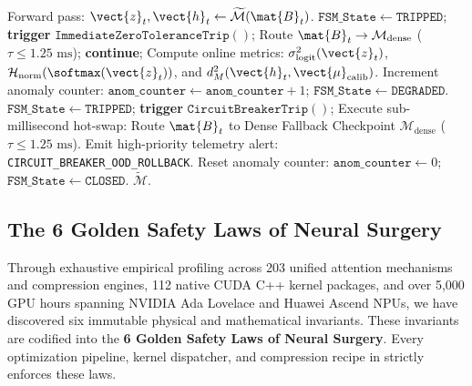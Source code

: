 \begin{algorithm}[t]
\begin{algorithmic}[1]
    \STATE Forward pass: $\vect{z}_t, \vect{h}_t \leftarrow \widetilde{\mathcal{M}}(\mat{B}_t)$.
        \STATE $\mathtt{FSM\_State} \leftarrow \mathtt{TRIPPED}$; \textbf{trigger} $\mathtt{ImmediateZeroToleranceTrip}()$;
        \STATE Route $\mat{B}_t \to \mathcal{M}_{\text{dense}}$ ($\tau \le 1.25\text{ ms}$); \textbf{continue};
    \ENDIF
    \STATE Compute online metrics: $\sigma_{\text{logit}}^2(\vect{z}_t)$, $\mathcal{H}_{\text{norm}}(\softmax(\vect{z}_t))$, and $d_M^2(\vect{h}_t, \vect{\mu}_{\text{calib}})$.
        \STATE Increment anomaly counter: $\mathtt{anom\_counter} \leftarrow \mathtt{anom\_counter} + 1$; $\mathtt{FSM\_State} \leftarrow \mathtt{DEGRADED}$.
            \STATE $\mathtt{FSM\_State} \leftarrow \mathtt{TRIPPED}$; \textbf{trigger} $\mathtt{CircuitBreakerTrip}()$;
            \STATE Execute sub-millisecond hot-swap: Route $\mat{B}_t$ to Dense Fallback Checkpoint $\mathcal{M}_{\text{dense}}$ ($\tau \le 1.25\text{ ms}$).
            \STATE Emit high-priority telemetry alert: \texttt{CIRCUIT\_BREAKER\_OOD\_ROLLBACK}.
        \ENDIF
    \ELSE
        \STATE Reset anomaly counter: $\mathtt{anom\_counter} \leftarrow 0$; $\mathtt{FSM\_State} \leftarrow \mathtt{CLOSED}$.
    \ENDIF
\ENDFOR
\RETURN $\widetilde{\mathcal{M}}$.
\end{algorithmic}
\end{algorithm}

\subsection{The 6 Golden Safety Laws of Neural Surgery}
\label{sec:golden_safety_laws}

Through exhaustive empirical profiling across 203 unified attention mechanisms and compression engines, 112 native CUDA C++ kernel packages, and over 5,000 GPU hours spanning NVIDIA Ada Lovelace and Huawei Ascend NPUs, we have discovered six immutable physical and mathematical invariants. These invariants are codified into the \textbf{6 Golden Safety Laws of Neural Surgery}. Every optimization pipeline, kernel dispatcher, and compression recipe in \neuralops{} strictly enforces these laws.

